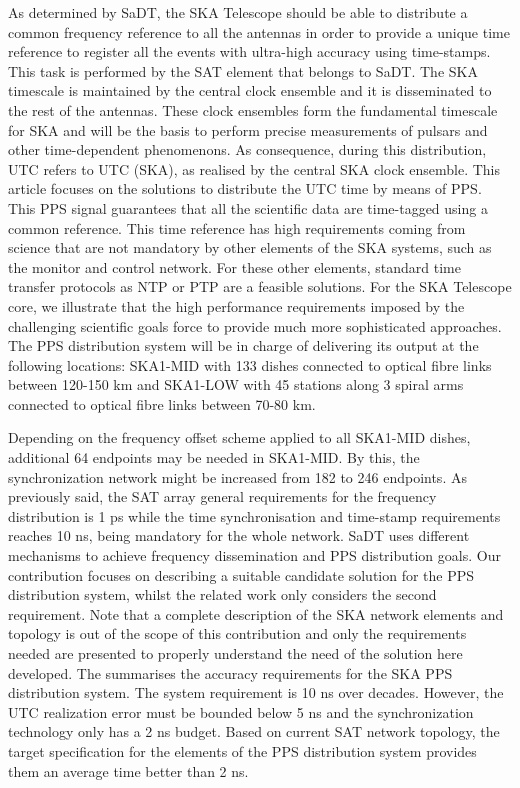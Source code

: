 As determined by SaDT, the SKA Telescope should be able to distribute a common frequency reference to all the antennas in order to provide a unique time reference to register all the events with ultra-high accuracy using time-stamps. This task is performed by the SAT element that belongs to SaDT. The SKA timescale is maintained by the central clock ensemble and it is disseminated to the rest of the antennas. These clock ensembles form the fundamental timescale for SKA and will be the basis to perform precise measurements of pulsars and other time-dependent phenomenons. As consequence,
during this distribution, UTC refers to UTC (SKA), as realised by the central
SKA clock ensemble.  This article focuses on the solutions to distribute
the UTC time by means of PPS. This PPS signal guarantees that all the
scientific data are time-tagged using a common reference. This time reference has high requirements coming from science that are not mandatory by other elements of the SKA systems, such as the monitor and control network. For these other elements, standard time transfer protocols as NTP or PTP are a feasible solutions. For the SKA Telescope core, we illustrate that the high performance
requirements imposed by the challenging scientific goals force to provide much
more sophisticated approaches.  The PPS distribution system will be in charge
of delivering its output at the following locations: SKA1-MID with 133 dishes
connected to optical fibre links between 120-150 km and SKA1-LOW with 45
stations along 3 spiral arms connected to optical fibre links between 70-80 km.

Depending on the frequency offset scheme applied to all SKA1-MID dishes,
additional 64 endpoints may be needed in SKA1-MID. By this, the synchronization
network might be increased from 182 to 246 endpoints.  
As previously said, the SAT array general requirements for the frequency distribution is 1 ps 
while the time synchronisation and time-stamp requirements reaches 10 ns, being mandatory for the whole network.
SaDT uses different mechanisms to achieve frequency dissemination and PPS distribution goals. 
Our contribution  focuses on describing a  suitable candidate solution for the PPS distribution system, whilst the related work only considers the second requirement. Note that a complete description of the SKA network elements and topology is out of the scope of this contribution and only the requirements needed are presented to properly understand the need of the solution here developed. The \cite{paultests} summarises the accuracy requirements for the SKA PPS distribution system. The system requirement is 10 ns over decades. However, the UTC realization error must be bounded below 5 ns and the synchronization technology only has a 2 ns budget.
Based on current SAT network topology, the target specification for the elements of the PPS distribution system provides them an average time better than 2 ns.

